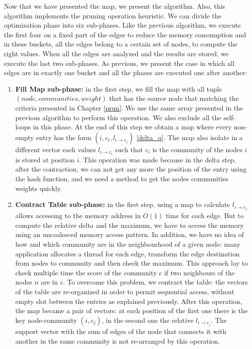 Now that we have presented the map, we present the algorithm. Also, this algorithm implements the pruning operation heuristic. We can divide the optimization phase into six sub-phases.
Like the previous algorithm, we execute the first four on a fixed part of the edges to reduce the memory consumption and in these buckets, all the edges belong to a certain set of nodes, to compute the right values. When all the edges are analyzed and the results are stored, we execute the last two sub-phases. As previous, we present the case in which all edges are in exactly one bucket and all the phases are executed one after another:
\begin{enumerate}
	\item \textbf{Fill Map sub-phase:} in the first step, we fill the map with all tuple \\$(node, communities, weight)$ that has the source node that matching the criteria presented in Chapter \ref{prun}. We use the same array presented in the previous algorithm to perform this operation. We also exclude all the self-loops in this phase. At the end of this step we obtain a map where every non-empty entry has the form $(i, c_i, l_{i \rightarrow c_j})$ \ref{delta_q}. The map also isolate in a different vector each values $l_{i \rightarrow c_i}$ such that $c_i$ is the community of the nodes $i$ is stored at position $i$. This operation was made because in the delta step, after the contraction, we can not get any more the position of the entry using the hash function, and we need a method to get the nodes communities weights quickly.
	\item \textbf{Contract Table sub-phase:} in the first step, using a map to calculate $l_{i \rightarrow c_j}$ allows accessing to the memory address in $O(1)$ time for each edge. But to compute the relative delta and the maximum, we have to access the memory using an uncoalesced memory access pattern. In addition, we have no idea of how and which community are in the neighbourhood of a given node: many application allocates a thread for each edge, transform the edge destination from nodes to community and then check the maximum. This approach lay to check multiple time the score of the community $c$ if two neighbours of the nodes $n$ are in $c$. To overcome this problem, we contract the table: the vectors of the table are re-organized in order to permit sequential access, without empty slot between the entries as explained previously. After this operation, the map became a pair of vectors: at each position of the first one there is the key node-community $(i, c_j)$, in the second one the relative $l_{i \rightarrow c_j}$. The support vector with the sum of edges of the node that connects it with another in the same community is not re-arranged by this operation.

\end{enumerate}
